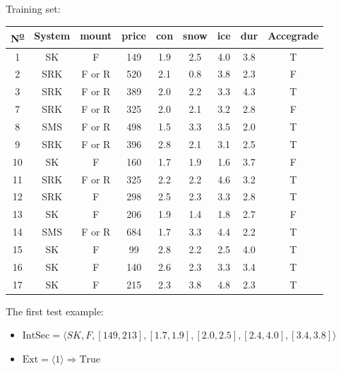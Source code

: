 \documentclass[12pt]{report}
\begin{document}
\begin{solution}
\begin{enumerate}
\begin{table}[H]
\begin{tabular}{|c|c|c|c|c|c|c|c|c|}
      \end{tabular}
      \end{table}
    Training set:
    \begin{table}[H]
      \centering
      \begin{tabular}{|c|c|c|c|c|c|c|c|c|}
      \hline
      N\textsuperscript{\underline{o}}  & System & mount  & price & con & snow & ice & dur & Accegrade \\ \hline
      1  & SK     & F      & 149   & 1.9 & 2.5  & 4.0 & 3.8 & T         \\ \hline
      2  & SRK    & F or R & 520   & 2.1 & 0.8  & 3.8 & 2.3 & F         \\ \hline
      3  & SRK    & F or R & 389   & 2.0 & 2.2  & 3.3 & 4.3 & T         \\ \hline
      7  & SRK    & F or R & 325   & 2.0 & 2.1  & 3.2 & 2.8 & F        \\ \hline
      8  & SMS    & F or R & 498   & 1.5 & 3.3  & 3.5 & 2.0 & T         \\ \hline
      9  & SRK    & F or R & 396   & 2.8 & 2.1  & 3.1 & 2.5 & T         \\ \hline
      10 & SK     & F      & 160   & 1.7 & 1.9  & 1.6 & 3.7 & F         \\ \hline
      11 & SRK    & F or R & 325   & 2.2 & 2.2  & 4.6 & 3.2 & T         \\ \hline
      12 & SRK    & F      & 298   & 2.5 & 2.3  & 3.3 & 2.8 & T         \\ \hline
      13 & SK     & F      & 206   & 1.9 & 1.4  & 1.8 & 2.7 & F         \\ \hline
      14 & SMS    & F or R & 684   & 1.7 & 3.3  & 4.4 & 2.2 & T         \\ \hline
      15 & SK     & F      & 99    & 2.8 & 2.2  & 2.5 & 4.0 & T         \\ \hline
      16 & SK     & F      & 140   & 2.6 & 2.3  & 3.3 & 3.4 & T         \\ \hline
      17 & SK     & F      & 215   & 2.3 & 3.8  & 4.8 & 2.3 & T         \\ \hline
      \end{tabular}
      \end{table}
      The first test example:
      \begin{itemize}
        \item $\text{IntSec} = \langle SK, F, [ 149, 213], [1.7, 1.9], [2.0, 2.5], [2.4, 4.0], [3.4, 3.8] \rangle$
        \item $\text{Ext} = \langle 1 \rangle \Longrightarrow \text{True}$

\end{itemize}
\end{enumerate}
\end{solution}
\end{document}
